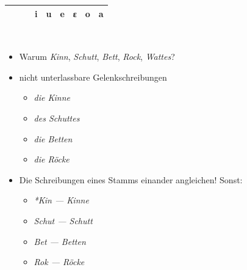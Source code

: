 \begin{frame}
{\begin{tabular}{lllllllll}
      \midrule
      & & & \textbf{i} & \textbf{u} & \textbf{e} & \textbf{ε} & \textbf{o} & \textbf{a} \\

      \bottomrule
    \end{tabular}
  }\\
  \pause
  \Viertelzeile
  \raggedright
  \begin{itemize}[<+->]
    \item Warum \textit{Kinn}, \textit{Schutt}, \textit{Bett}, \textit{Rock}, \textit{Wattes}?
    \item \alert{nicht unterlassbare Gelenkschreibungen}
      \begin{itemize}[<+->]
        \item \textit{die Ki\alert{nn}e}
        \item \textit{des Schu\alert{tt}es}
        \item \textit{die Be\alert{tt}en}
        \item \textit{die Rö\alert{ck}e}
      \end{itemize}
    \item \alert{Die Schreibungen eines Stamms einander angleichen!} Sonst:
      \begin{itemize}[<+->]
        \item \textit{*Kin --- Kinne}
        \item \textit{Schut --- Schutt}
        \item \textit{Bet --- Betten}
        \item \textit{Rok --- Röcke}
      \end{itemize}
  \end{itemize}
\end{frame}


